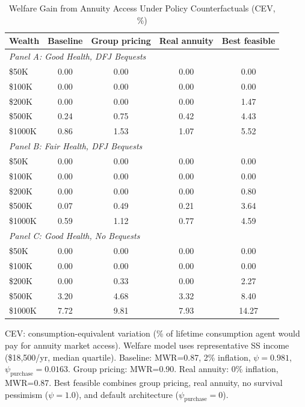\begin{table}[htbp]
\centering
\caption{Welfare Gain from Annuity Access Under Policy Counterfactuals (CEV, \%)}
\label{tab:cev_counterfactuals}
\begin{tabular}{lcccc}
\toprule
Wealth & Baseline & Group pricing & Real annuity & Best feasible \\
\midrule
\multicolumn{5}{l}{\textit{Panel A: Good Health, DFJ Bequests}} \\
\$50K & 0.00 & 0.00 & 0.00 & 0.00 \\
\$100K & 0.00 & 0.00 & 0.00 & 0.00 \\
\$200K & 0.00 & 0.00 & 0.00 & 1.47 \\
\$500K & 0.24 & 0.75 & 0.42 & 4.43 \\
\$1000K & 0.86 & 1.53 & 1.07 & 5.52 \\
\midrule
\multicolumn{5}{l}{\textit{Panel B: Fair Health, DFJ Bequests}} \\
\$50K & 0.00 & 0.00 & 0.00 & 0.00 \\
\$100K & 0.00 & 0.00 & 0.00 & 0.00 \\
\$200K & 0.00 & 0.00 & 0.00 & 0.80 \\
\$500K & 0.07 & 0.49 & 0.21 & 3.64 \\
\$1000K & 0.59 & 1.12 & 0.77 & 4.59 \\
\midrule
\multicolumn{5}{l}{\textit{Panel C: Good Health, No Bequests}} \\
\$50K & 0.00 & 0.00 & 0.00 & 0.00 \\
\$100K & 0.00 & 0.00 & 0.00 & 0.00 \\
\$200K & 0.00 & 0.33 & 0.00 & 2.27 \\
\$500K & 3.20 & 4.68 & 3.32 & 8.40 \\
\$1000K & 7.72 & 9.81 & 7.93 & 14.27 \\
\bottomrule
\end{tabular}
\begin{tablenotes}
\small
\item CEV: consumption-equivalent variation (\% of lifetime consumption
agent would pay for annuity market access). Welfare model uses representative
SS income (\$18{,}500/yr, median quartile). Baseline: MWR=0.87, 2\% inflation,
$\psi=0.981$, $\psi_{\text{purchase}}=0.0163$. Group pricing: MWR=0.90.
Real annuity: 0\% inflation, MWR=0.87. Best feasible combines group pricing,
real annuity, no survival pessimism ($\psi=1.0$), and default architecture
($\psi_{\text{purchase}}=0$).
\end{tablenotes}
\end{table}
